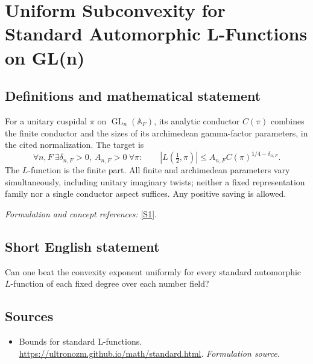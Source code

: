 \documentclass[11pt]{article}
\begin{document}
\section*{\texorpdfstring{Uniform Subconvexity for Standard Automorphic L-Functions on GL(n)}{Uniform Subconvexity for Standard Automorphic L-Functions on GL(n)}}\label{30006752}
\subsection{Definitions and mathematical statement}
For a unitary cuspidal $\pi$ on $\operatorname{GL}_n({\mathbb{A}}_F)$, its analytic conductor $C(\pi)$ combines the finite conductor and the sizes of its archimedean gamma-factor parameters, in the cited normalization. The target is
\[
 \forall n,F\ \exists\delta_{n,F}>0,\ A_{n,F}>0\ \forall\pi:\qquad
 |L(\tfrac12,\pi)|\le A_{n,F}C(\pi)^{1/4-\delta_{n,F}}.
\]
The $L$-function is the finite part. All finite and archimedean parameters vary simultaneously, including unitary imaginary twists; neither a fixed representation family nor a single conductor aspect suffices. Any positive saving is allowed.
\par\smallskip\textit{Formulation and concept references:} \href{https://ultronozm.github.io/math/standard.html}{[S1]}.

\subsection{Short English statement}
Can one beat the convexity exponent uniformly for every standard automorphic $L$-function of each fixed degree over each number field?
\subsection{Sources}
\begin{itemize}
\item[S1]Bounds for standard L-functions.
\url{https://ultronozm.github.io/math/standard.html}.
\textit{Formulation source.}
\end{itemize}
\end{document}
